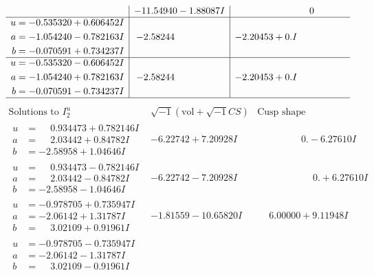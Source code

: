 \documentclass[1p]{elsarticle_modified}
\theoremstyle{definition}
\newcommand{\I}{\sqrt{-1}}
\begin{document}
$$\begin{array}{c|c|c}
 & -11.54940 - 1.88087 I & \phantom{-0.000000 } 0 \\ \hline\begin{aligned}
u &= -0.535320 + 0.606452 I \\
a &= -1.054240 - 0.782163 I \\
b &= -0.070591 + 0.734237 I\end{aligned}
 & -2.58244\phantom{ +0.000000I} & -2.20453 + 0. I\phantom{ +0.000000I} \\ \hline\begin{aligned}
u &= -0.535320 - 0.606452 I \\
a &= -1.054240 + 0.782163 I \\
b &= -0.070591 - 0.734237 I\end{aligned}
 & -2.58244\phantom{ +0.000000I} & -2.20453 + 0. I\phantom{ +0.000000I}\\
 \hline 
 \end{array}$$\newpage$$\begin{array}{c|c|c}  
\text{Solutions to }I^u_{2}& \I (\text{vol} + \sqrt{-1}CS) & \text{Cusp shape}\\
 \hline 
\begin{aligned}
u &= \phantom{-}0.934473 + 0.782146 I \\
a &= \phantom{-}2.03442 + 0.84782 I \\
b &= -2.58958 + 1.04646 I\end{aligned}
 & -6.22742 + 7.20928 I & \phantom{-0.000000 } 0. - 6.27610 I \\ \hline\begin{aligned}
u &= \phantom{-}0.934473 - 0.782146 I \\
a &= \phantom{-}2.03442 - 0.84782 I \\
b &= -2.58958 - 1.04646 I\end{aligned}
 & -6.22742 - 7.20928 I & \phantom{-0.000000 -}0. + 6.27610 I \\ \hline\begin{aligned}
u &= -0.978705 + 0.735947 I \\
a &= -2.06142 + 1.31787 I \\
b &= \phantom{-}3.02109 + 0.91961 I\end{aligned}
 & -1.81559 - 10.65820 I & \phantom{-}6.00000 + 9.11948 I \\ \hline\begin{aligned}
u &= -0.978705 - 0.735947 I \\
a &= -2.06142 - 1.31787 I \\
b &= \phantom{-}3.02109 - 0.91961 I\end{aligned}

\end{array}$$
\end{document}
